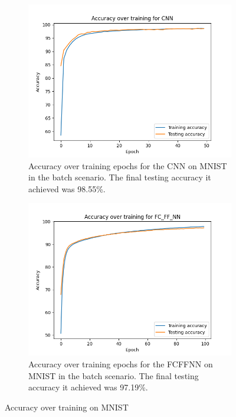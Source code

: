 \begin{figure}[htbp]
    \centering
    \begin{subfigure}[t]{0.45\linewidth}
      \centering
      \includegraphics[width=\textwidth]{images/MNIST/CNN_acc.png}
      \caption{Accuracy over training epochs for the CNN on MNIST in the batch scenario. The final testing accuracy it achieved was 98.55\%.}
      \label{fig:MNIST-Batch-CNN-acc}
    \end{subfigure}
    \hspace{0.5cm}
    \begin{subfigure}[t]{0.45\linewidth}
      \centering
      \includegraphics[width=\textwidth]{images/MNIST/FC_FF_NN_acc.png}
      \caption{Accuracy over training epochs for the FCFFNN on MNIST in the batch scenario. The final testing accuracy it achieved was 97.19\%.}
      \label{fig:MNIST-Batch-FCFFNN-acc}
    \end{subfigure}
    \caption{Accuracy over training on MNIST}
    \label{fig:MNIST-Batch-acc}
\end{figure}

